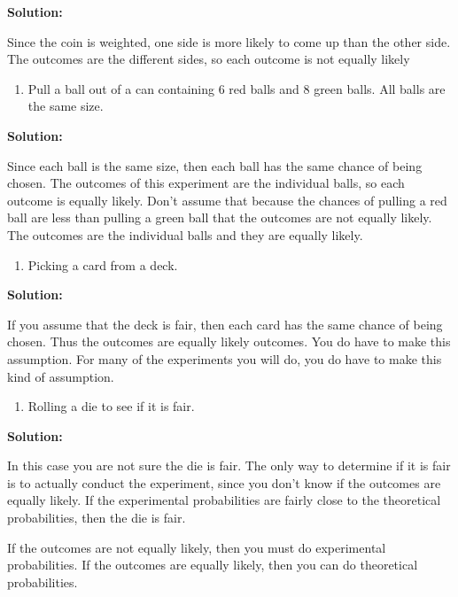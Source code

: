 \documentclass[]{book}
\providecommand{\tightlist}{%
  \setlength{\itemsep}{0pt}\setlength{\parskip}{0pt}}
\begin{document}
\textbf{Solution:}

Since the coin is weighted, one side is more likely to come up than the other side. The outcomes are the different sides, so each outcome is not equally likely

\begin{enumerate}
\def\labelenumi{\alph{enumi}.}
\setcounter{enumi}{2}
\tightlist
\item
  Pull a ball out of a can containing 6 red balls and 8 green balls.
  All balls are the same size.
\end{enumerate}

\textbf{Solution:}

Since each ball is the same size, then each ball has the same chance of being chosen. The outcomes of this experiment are the individual balls, so each outcome is equally likely. Don't assume that because the chances of pulling a red ball are less than pulling a green ball that the outcomes are not equally likely. The outcomes are the individual balls and they are equally likely.

\begin{enumerate}
\def\labelenumi{\alph{enumi}.}
\setcounter{enumi}{3}
\tightlist
\item
  Picking a card from a deck.
\end{enumerate}

\textbf{Solution:}

If you assume that the deck is fair, then each card has the same chance of being chosen. Thus the outcomes are equally likely outcomes. You do have to make this assumption. For many of the
experiments you will do, you do have to make this kind of
assumption.

\begin{enumerate}
\def\labelenumi{\alph{enumi}.}
\setcounter{enumi}{4}
\tightlist
\item
  Rolling a die to see if it is fair.
\end{enumerate}

\textbf{Solution:}

In this case you are not sure the die is fair. The only way to determine if it is fair is to actually conduct the experiment, since you don't know if the outcomes are equally likely. If the
experimental probabilities are fairly close to the theoretical probabilities, then the die is fair.

If the outcomes are not equally likely, then you must do experimental probabilities. If the outcomes are equally likely, then you can do theoretical probabilities.
\end{document}
